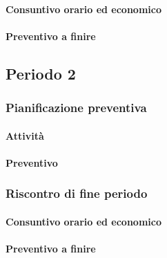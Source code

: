 \paragraph{Consuntivo orario ed economico}


\paragraph{Preventivo a finire}



\subsection{Periodo 2}

\subsubsection{Pianificazione preventiva}

\paragraph{Attività}

\planningTable{
	
}



\paragraph{Preventivo}



\subsubsection{Riscontro di fine periodo}


\paragraph{Consuntivo orario ed economico}


\paragraph{Preventivo a finire}